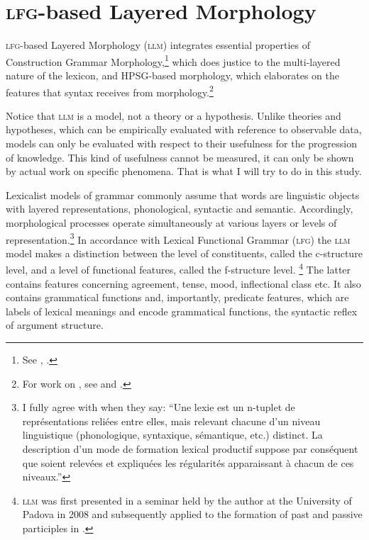 \documentclass[output=paper]{langsci/langscibook}
\begin{document}
\section{\textsc{lfg}-based Layered Morphology}\label{lfg-based-layered-morphology}

\textsc{lfg}-based Layered Morphology (\textsc{llm}) integrates essential properties of Construction Grammar Morphology,\footnote{See %
\citet{Booij10}%
%
, %
\citet{Booij2017}%
%
.} which does justice to the multi-layered nature of the lexicon, and HPSG-based morphology, which elaborates on the features that syntax receives from morphology.\footnote{For work on , see %
\citet{Fradin2005} %
%
and %
\citet[]{Tribout2010a}%
%
.}

Notice that \textsc{llm} is a model, not a theory or a hypothesis. Unlike theories and hypotheses, which can be empirically evaluated with reference to observable data, models can only be evaluated with respect to their usefulness for the progression of knowledge. This kind of usefulness cannot be measured, it can only be shown by actual work on specific phenomena. That is what I will try to do in this study.


Lexicalist models of grammar commonly assume that words are linguistic objects with layered representations, phonological, syntactic and semantic. Accordingly, morphological processes operate simultaneously at various layers or levels of representation.\footnote{I fully agree with %
\citet[1]{Aurnague2008}%
%
 when they say: \enquote{Une lexie est un n-tuplet de représentations reliées entre elles, mais relevant chacune d'un niveau linguistique (phonologique, syntaxique, sémantique, etc.) distinct. La description d'un mode de formation lexical productif suppose par conséquent que soient relevées et expliquées les régularités apparaissant à chacun de ces niveaux.}} In accordance with Lexical Functional Grammar (\textsc{lfg}) the \textsc{llm} model makes a distinction between the level of constituents, called the c-structure level, and a level of functional features, called the f-structure level.%
\footnote{\textsc{llm} was first presented in a seminar held by the author at the University of Padova in 2008 and subsequently applied to the formation of  past and passive participles in %
\citet{Schwarze2011}%
%
.} The latter contains features concerning agreement, tense, mood, inflectional class etc. It also contains grammatical functions and, importantly,
predicate features, which are labels of lexical meanings and encode grammatical functions, the syntactic reflex of argument structure.
\end{document}
